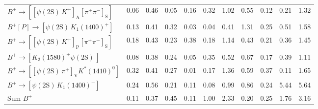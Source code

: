 \begin{tabular}{l  c  c  c  c  c  c  c  c  c  | c }
$B^{+}\rightarrow \left[\left[\psi(\text{2S})\,K^{+}\right]_{\text{A}}\left[\pi^{+}\pi^{-}\right]_{\text{S}}\right]$ & 0.06 & 0.46 & 0.05 & 0.16 & 0.32 & 1.02 & 0.55 & 0.12 & 0.21 & 1.32 \\ 
$B^{+}\left[P\right]\rightarrow \left[\psi(\text{2S})\,K_{1}(1400)^{+}\right]$ & 0.13 & 0.41 & 0.32 & 0.03 & 0.04 & 0.41 & 1.31 & 0.25 & 0.51 & 1.58 \\ 
$B^{+}\rightarrow \left[\left[\psi(\text{2S})\,K^{+}\right]_{\text{P}}\left[\pi^{+}\pi^{-}\right]_{\text{S}}\right]$ & 0.18 & 0.43 & 0.23 & 0.38 & 0.18 & 1.14 & 0.43 & 0.21 & 0.36 & 1.45 \\ 
$B^{+}\rightarrow \left[K_{2}(1580)^{+}\psi(\text{2S})\,\right]$ & 0.08 & 0.38 & 0.24 & 0.05 & 0.35 & 0.52 & 0.67 & 0.17 & 0.39 & 1.11 \\ 
$B^{+}\rightarrow \left[\left[\psi(\text{2S})\,\pi^{+}\right]_{\text{V}}K^{*}(1410)^{0}\right]$ & 0.32 & 0.41 & 0.27 & 0.01 & 0.17 & 1.36 & 0.59 & 0.37 & 0.11 & 1.65 \\ 
$B^{+}\rightarrow \left[\psi(\text{2S})\,K_{1}(1400)^{+}\right]$ & 0.24 & 0.56 & 0.21 & 0.11 & 0.08 & 0.99 & 0.86 & 0.24 & 5.44 & 5.64 \\ 
$\text{Sum } B^{+}$ & 0.11 & 0.37 & 0.45 & 0.11 & 1.00 & 2.33 & 0.20 & 0.25 & 1.76 & 3.16 \\ 
\hline
\hline
\end{tabular}
